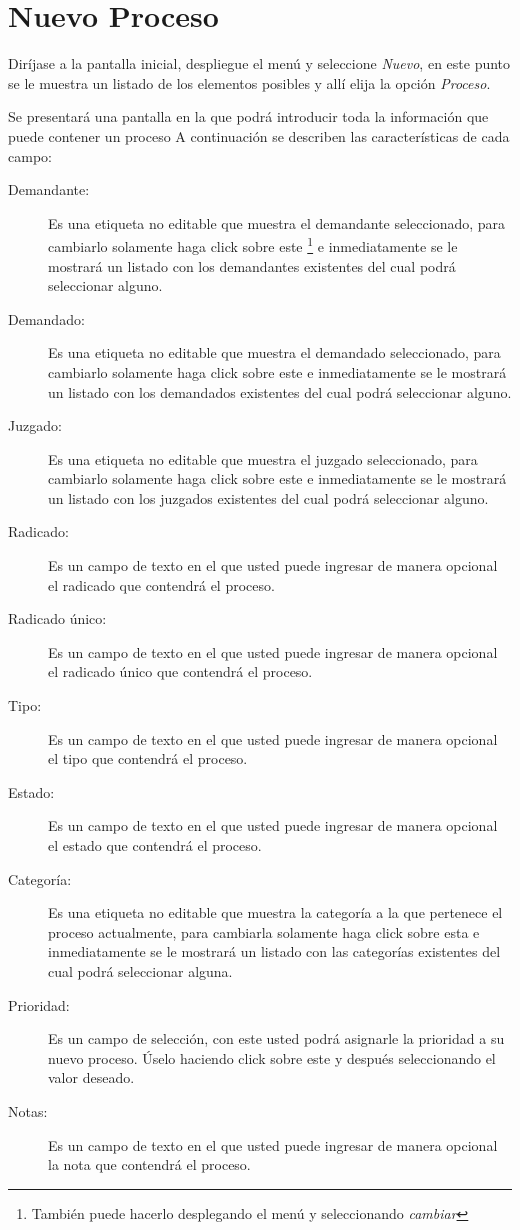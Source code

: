 \section{Nuevo Proceso}
\label{sec:nuevoProceso}
Dir\'ijase a la pantalla inicial, despliegue el men\'u \blackberry y seleccione
\emph{Nuevo}, en este punto se le muestra un listado de los elementos posibles y
all\'i elija la opci\'on \emph{Proceso}.

Se presentar\'a una pantalla en la que podr\'a introducir toda la informaci\'on
que puede contener un proceso A continuaci\'on se describen las
caracter\'isticas de cada campo:
\begin{description}
\item[Demandante:]Es una etiqueta no editable que muestra el demandante
seleccionado, para cambiarlo solamente haga click sobre este
\footnote{Tambi\'en puede hacerlo desplegando el men\'u \blackberry y
seleccionando \emph{cambiar}}
e inmediatamente se
le mostrar\'a un listado con los demandantes existentes del cual podr\'a
seleccionar alguno.
\item[Demandado:]Es una etiqueta no editable que muestra el demandado
seleccionado, para cambiarlo solamente haga click sobre este
\footnotemark[\value{footnote}]
e inmediatamente
se le mostrar\'a un listado con los demandados existentes del cual podr\'a
seleccionar alguno.
\item[Juzgado:]Es una etiqueta no editable que muestra el juzgado
seleccionado, para cambiarlo solamente haga click sobre este
\footnotemark[\value{footnote}]
e inmediatamente
se le mostrar\'a un listado con los juzgados existentes del cual podr\'a
seleccionar alguno.
\item[Radicado:]Es un campo de texto en el que usted puede ingresar de manera
opcional el radicado que contendr\'a el proceso.
\item[Radicado \'unico:]Es un campo de texto en el que usted puede ingresar de
manera opcional el radicado \'unico que contendr\'a el proceso.
\item[Tipo:]Es un campo de texto en el que usted puede ingresar de manera
opcional el tipo que contendr\'a el proceso.
\item[Estado:]Es un campo de texto en el que usted puede ingresar de manera
opcional el estado que contendr\'a el proceso.
\item[Categor\'ia:]Es una etiqueta no editable que muestra la categor\'ia
a la que pertenece el proceso actualmente, para cambiarla solamente haga click
sobre esta
\footnotemark[\value{footnote}]
e inmediatamente
se le mostrar\'a un listado con las categor\'ias existentes del cual podr\'a
seleccionar alguna.
\item[Prioridad:]Es un campo de selecci\'on, con este usted podr\'a asignarle
la prioridad a su nuevo proceso. \'Uselo haciendo click sobre este y
despu\'es seleccionando el valor deseado.
\item[Notas:]Es un campo de texto en el que usted puede ingresar de manera
opcional la nota que contendr\'a el proceso.
\end{description}

